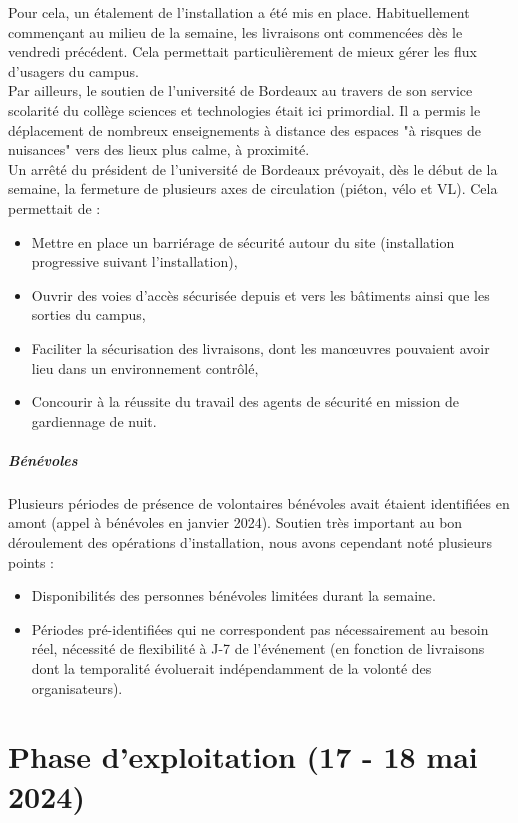 \documentclass[12pt,a4paper]{report}
\begin{document}
Pour cela, un étalement de l'installation a été mis en place. Habituellement commençant au milieu de la semaine, les livraisons ont commencées dès le vendredi précédent. Cela permettait particulièrement de mieux gérer les flux d'usagers du campus.\\

Par ailleurs, le soutien de l'université de Bordeaux au travers de son service scolarité du collège sciences et technologies était ici primordial. Il a permis le déplacement de nombreux enseignements à distance des espaces "à risques de nuisances" vers des lieux plus calme, à proximité.\\

Un arrêté du président de l'université de Bordeaux prévoyait, dès le début de la semaine, la fermeture de plusieurs axes de circulation (piéton, vélo et VL). Cela permettait de :
\begin{itemize}
\item Mettre en place un barriérage de sécurité autour du site (installation progressive suivant l'installation),
\item Ouvrir des voies d'accès sécurisée depuis et vers les bâtiments ainsi que les sorties du campus,
\item Faciliter la sécurisation des livraisons, dont les manœuvres pouvaient avoir lieu dans un environnement contrôlé,
\item Concourir à la réussite du travail des agents de sécurité en mission de gardiennage de nuit.\\
\end{itemize}

\subparagraph{Bénévoles}

Plusieurs périodes de présence de volontaires bénévoles avait étaient identifiées en amont (appel à bénévoles en janvier 2024). Soutien très important au bon déroulement des opérations d'installation, nous avons cependant noté plusieurs points : 
\begin{itemize}
\item Disponibilités des personnes bénévoles limitées durant la semaine.
\item Périodes pré-identifiées qui ne correspondent pas nécessairement au besoin réel, nécessité de flexibilité à J-7 de l'événement (en fonction de livraisons dont la temporalité évoluerait indépendamment de la volonté des organisateurs).
\end{itemize}

\section{Phase d'exploitation (17 - 18 mai 2024)}
\vfill
\end{document}
